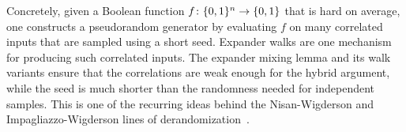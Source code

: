 Concretely, given a Boolean function \(f\colon\{0,1\}^n\to\{0,1\}\) that is hard on average, one constructs a pseudorandom generator by evaluating \(f\) on many correlated inputs that are sampled using a short seed. Expander walks are one mechanism for producing such correlated inputs. The expander mixing lemma and its walk variants ensure that the correlations are weak enough for the hybrid argument, while the seed is much shorter than the randomness needed for independent samples. This is one of the recurring ideas behind the Nisan-Wigderson and Impagliazzo-Wigderson lines of derandomization~\cite{IW1997}.
